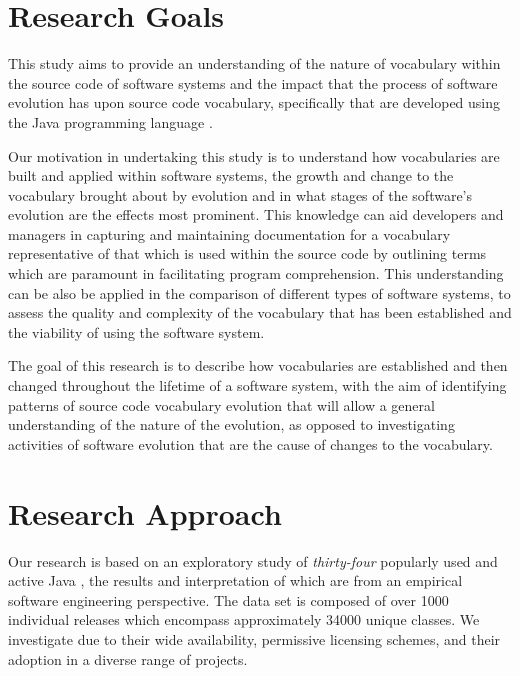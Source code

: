 \section{Research Goals} %
\label{sec:research_goals}

This study aims to provide an understanding of the nature of vocabulary within the source code of software systems and the impact that the process of software evolution has upon source code vocabulary, specifically \OSYS that are developed using the Java programming language \cite{Gosling00a}.

Our motivation in undertaking this study is to understand how vocabularies are built and applied within software systems, the growth and change to the vocabulary brought about by evolution and in what stages of the software's evolution are the effects most prominent. This knowledge can aid developers and managers in capturing and maintaining documentation for a vocabulary representative of that which is used within the source code by outlining terms which are paramount in facilitating program comprehension. This understanding can be also be applied in the comparison of different types of software systems, to assess the quality and complexity of the vocabulary that has been established and the viability of using the software system.

The goal of this research is to describe how vocabularies are established and then changed throughout the lifetime of a software system, with the aim of identifying patterns of source code vocabulary evolution that will allow a general understanding of the nature of the evolution, as opposed to investigating activities of software evolution that are the cause of changes to the vocabulary.


\section{Research Approach} %
\label{sec:research_approach}

Our research is based on an exploratory study of \emph{thirty-four} popularly used and active Java {\OSYS}, the results and interpretation of which are from an empirical software engineering perspective. The data set is composed of over 1000 individual releases which encompass approximately 34000 unique classes. We investigate {\OSYS} due to their wide availability, permissive licensing schemes, and their adoption in a diverse range of projects.

